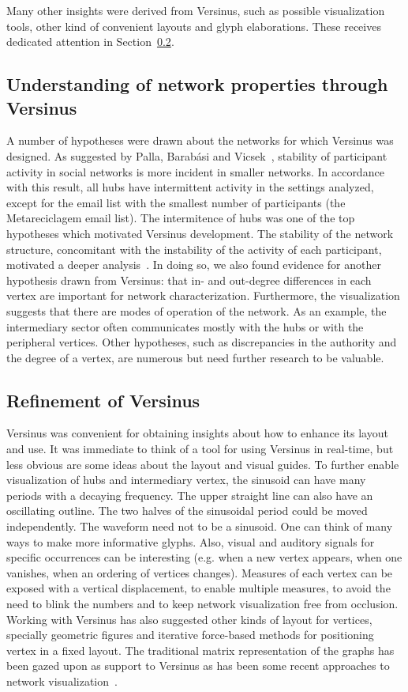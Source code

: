 Many other insights were derived from Versinus, such as possible visualization tools, other kind of convenient layouts and glyph elaborations.
These receives dedicated attention in Section~\ref{sec:verref}.

\subsection{Understanding of network properties through Versinus}
A number of hypotheses were drawn about the networks for which Versinus was designed.
As suggested by Palla, Barab\'asi and Vicsek~\cite{barabasiEvo}, stability of participant activity in social networks is more incident in smaller networks.
In accordance with this result, all hubs have intermittent activity in the settings analyzed, except for the email list with the smallest number of participants (the Metareciclagem email list).
The intermitence of hubs was one of the top hypotheses which motivated Versinus development.
The stability of the network structure, concomitant with the instability of the activity of each participant,
motivated a deeper analysis~\cite{stab}.
In doing so, we also found evidence for another hypothesis drawn from Versinus:
that in- and out-degree differences in each vertex are important for network characterization.
Furthermore, the visualization suggests that there are modes of operation of the network.
As an example, the intermediary sector often communicates mostly with the hubs or with the peripheral vertices.
Other hypotheses,
such as discrepancies in the authority and the degree of a vertex,
are numerous but need further research to be valuable.
 
\subsection{Refinement of Versinus}\label{sec:verref}
Versinus was convenient for obtaining insights about how to enhance its layout and use.
It was immediate to think of a tool for using Versinus
in real-time, but less obvious are some ideas about the layout and visual guides. 
To further enable visualization of hubs and intermediary vertex,
the sinusoid can have many periods 
with a decaying frequency.
The upper straight line can also have an oscillating outline.
The two halves of the sinusoidal period could be moved independently.
The waveform need not to be a sinusoid.
One can think of many ways to make more informative glyphs.
Also, visual and auditory signals for specific occurrences can be interesting
(e.g. when a new vertex appears, when one vanishes, when an ordering of vertices changes).
Measures of each vertex can be exposed with a vertical displacement,
to enable multiple measures, to avoid the need to blink the numbers and to keep network visualization free from occlusion.
Working with Versinus has also suggested other kinds of layout for vertices, 
specially geometric figures and iterative force-based methods for positioning vertex in a fixed layout.
The traditional matrix representation of the graphs has been gazed upon as support to Versinus 
as has been some recent approaches to network visualization~\cite{Viz1}.


